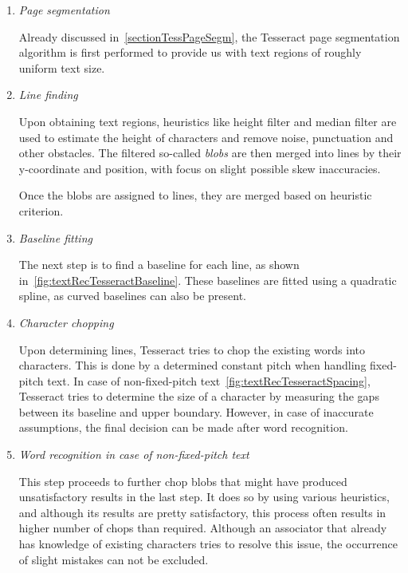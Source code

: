 \begin{enumerate}
    \item \emph{Page segmentation}
    
    Already discussed in~\cref{sectionTessPageSegm}, the Tesseract page segmentation algorithm is first performed to provide us with text regions of roughly uniform text size.
    
    \item \emph{Line finding}
     
     Upon obtaining text regions, heuristics like height filter and median filter are used to estimate the height of characters and remove noise, punctuation and other obstacles. The filtered so-called \emph{blobs} are then merged into lines by their y-coordinate and position, with focus on slight possible skew inaccuracies.
     
     Once the blobs are assigned to lines, they are merged based on heuristic criterion.
     
     \item \emph{Baseline fitting}
    
    The next step is to find a baseline for each line, as shown in~\cref{fig:textRecTesseractBaseline}. These baselines are fitted using a quadratic spline, as curved baselines can also be present.
    
    \item \emph{Character chopping}
    
    Upon determining lines, Tesseract tries to chop the existing words into characters. This is done by a determined constant pitch when handling fixed-pitch text. In case of non-fixed-pitch text~\cref{fig:textRecTesseractSpacing}, Tesseract tries to determine the size of a character by measuring the gaps between its baseline and upper boundary. However, in case of inaccurate assumptions, the final decision can be made after word recognition.
    
    \item \emph{Word recognition in case of non-fixed-pitch text}
    
    This step proceeds to further chop blobs that might have produced unsatisfactory results in the last step. It does so by using various heuristics, and although its results are pretty satisfactory, this process often results in higher number of chops than required. Although an associator that already has knowledge of existing characters tries to resolve this issue, the occurrence of slight mistakes can not be excluded.
    

\end{enumerate}
